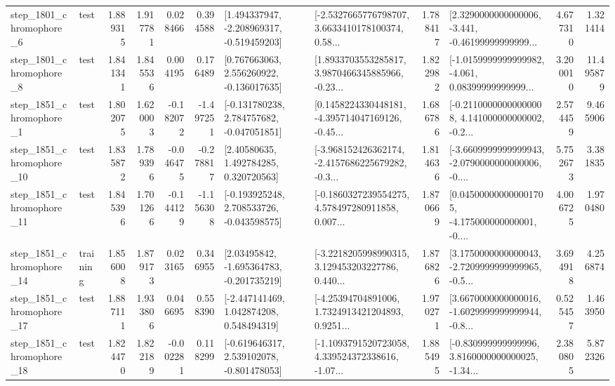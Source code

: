 \begin{tabular}{llrrrrllrlrr}
  step\_1801\_chromophore\_6 &      test &      1.889315 &    1.917781 &      0.028466 &  0.394588 &   [1.494337947, -2.208969317, -0.519459203] &  [-2.5327665776798707, 3.6633410178100374, 0.58... &       1.788417 &  [2.3290000000000006, -3.441, -0.46199999999999... &            4.677310 &          1.321414 \\
  step\_1801\_chromophore\_8 &      test &      1.841341 &    1.845536 &      0.004195 &  0.176489 &    [0.767663063, 2.556260922, -0.136017635] &  [1.8933703553285817, 3.9870466345885966, -0.23... &       1.822982 &  [-1.0159999999999982, -4.061, 0.08399999999999... &            3.200010 &         11.495879 \\
  step\_1851\_chromophore\_1 &      test &      1.802075 &    1.620003 &     -0.182072 & -1.497251 &   [-0.131780238, 2.784757682, -0.047051851] &  [0.1458224330448181, -4.395714047169126, -0.45... &       1.686786 &  [-0.21100000000000008, 4.141000000000002, -0.2... &            2.574459 &          9.465906 \\
 step\_1851\_chromophore\_10 &      test &      1.835872 &    1.789396 &     -0.046475 & -0.278817 &      [2.40580635, 1.492784285, 0.320720563] &  [-3.968152426362174, -2.4157686225679282, -0.3... &       1.814636 &  [-3.6609999999999943, -2.0790000000000006, -0.... &            5.752673 &          3.381835 \\
 step\_1851\_chromophore\_11 &      test &      1.845396 &    1.701266 &     -0.144129 & -1.156308 &   [-0.193925248, 2.708533726, -0.043598575] &  [-0.1860327239554275, 4.578497280911858, 0.007... &       1.870669 &  [0.045000000000001705, -4.175000000000001, -0.... &            4.006725 &          1.970480 \\
 step\_1851\_chromophore\_14 &  training &      1.856008 &    1.879173 &      0.023165 &  0.346955 &    [2.03495842, -1.695364783, -0.201735219] &  [-3.2218205998990315, 3.129453203227786, 0.440... &       1.876826 &  [3.1750000000000043, -2.7209999999999965, -0.5... &            3.694918 &          4.256874 \\
 step\_1851\_chromophore\_17 &      test &      1.887111 &    1.933806 &      0.046695 &  0.558390 &    [-2.447141469, 1.042874208, 0.548494319] &  [-4.25394704891006, 1.7324913421204893, 0.9251... &       1.970271 &  [3.6670000000000016, -1.6029999999999944, -0.8... &            0.525457 &          1.463950 \\
 step\_1851\_chromophore\_18 &      test &      1.824470 &    1.822189 &     -0.002281 &  0.118299 &   [-0.619646317, 2.539102078, -0.801478053] &  [-1.1093791520723058, 4.339524372338616, -1.07... &       1.885495 &  [-0.830999999999996, 3.8160000000000025, -1.34... &            2.380805 &          5.872326 \\

\end{tabular}
